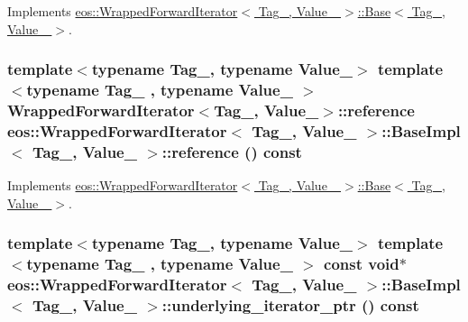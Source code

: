 Implements \hyperlink{structeos_1_1WrappedForwardIterator_1_1Base_a3e63d544a83f5324f323f0d04c2203a3}{eos::WrappedForwardIterator$<$ Tag\_\-, Value\_\- $>$::Base$<$ Tag\_\-, Value\_\- $>$}.\hypertarget{structeos_1_1WrappedForwardIterator_1_1BaseImpl_a61c99fb9827d32e094355f8c152e65f0}{
\subsubsection[{reference}]{\setlength{\rightskip}{0pt plus 5cm}template$<$typename Tag\_\-, typename Value\_\-$>$ template$<$typename Tag\_\- , typename Value\_\- $>$ {\bf WrappedForwardIterator}$<$Tag\_\-, Value\_\-$>$::reference {\bf eos::WrappedForwardIterator}$<$ Tag\_\-, Value\_\- $>$::{\bf BaseImpl}$<$ Tag\_\-, Value\_\- $>$::reference () const}}
\label{structeos_1_1WrappedForwardIterator_1_1BaseImpl_a61c99fb9827d32e094355f8c152e65f0}


Implements \hyperlink{structeos_1_1WrappedForwardIterator_1_1Base_a1cffbfbcead34d38a7390173496d70df}{eos::WrappedForwardIterator$<$ Tag\_\-, Value\_\- $>$::Base$<$ Tag\_\-, Value\_\- $>$}.\hypertarget{structeos_1_1WrappedForwardIterator_1_1BaseImpl_aae9d385a45b3ddddab20aec8e9f49fe8}{
\subsubsection[{underlying\_\-iterator\_\-ptr}]{\setlength{\rightskip}{0pt plus 5cm}template$<$typename Tag\_\-, typename Value\_\-$>$ template$<$typename Tag\_\- , typename Value\_\- $>$ const void$\ast$ {\bf eos::WrappedForwardIterator}$<$ Tag\_\-, Value\_\- $>$::{\bf BaseImpl}$<$ Tag\_\-, Value\_\- $>$::underlying\_\-iterator\_\-ptr () const}}
\label{structeos_1_1WrappedForwardIterator_1_1BaseImpl_aae9d385a45b3ddddab20aec8e9f49fe8}


